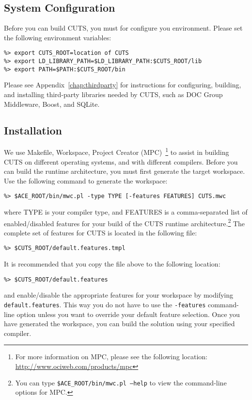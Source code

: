 \subsection{System Configuration}

Before you can build CUTS, you must for configure you environment. Please
set the following environment variables:
\begin{lstlisting}
%> export CUTS_ROOT=location of CUTS
%> export LD_LIBRARY_PATH=$LD_LIBRARY_PATH:$CUTS_ROOT/lib
%> export PATH=$PATH:$CUTS_ROOT/bin
\end{lstlisting}
Please see Appendix~\ref{chap:thirdparty} for instructions for configuring,
building, and installing third-party libraries needed by CUTS, such as 
DOC Group Middleware, Boost, and SQLite.

\subsection{Installation}

We use Makefile, Workspace, Project Creator (MPC)~\footnote{For more information
on MPC, please see the following location: \url{http://www.ociweb.com/products/mpc}}
to assist in building CUTS
on different operating systems, and with different compilers. Before you can
build the runtime architecture, you must first generate the target workspace.
Use the following command to generate the workspace:
\begin{lstlisting}
%> $ACE_ROOT/bin/mwc.pl -type TYPE [-features FEATURES] CUTS.mwc
\end{lstlisting}
where TYPE is your compiler type, and FEATURES is a comma-separated list of 
enabled/disabled features
for your build of the CUTS runtime architecture.\footnote{You can type 
\texttt{\$ACE\_ROOT/bin/mwc.pl --help} to view the command-line options for 
MPC.} The complete set of features for CUTS is located in the following
file:
\begin{lstlisting}
%> $CUTS_ROOT/default.features.tmpl
\end{lstlisting}
It is recommended that you copy the file above to the following location:
\begin{lstlisting}
%> $CUTS_ROOT/default.features
\end{lstlisting}
and enable/disable the appropriate features for your workspace by 
modifying \texttt{default.features}. This way you do not have to use 
the \texttt{-features} command-line option unless you want
to override your default feature selection. Once you have generated 
the workspace, you can build the solution using your specified compiler.

